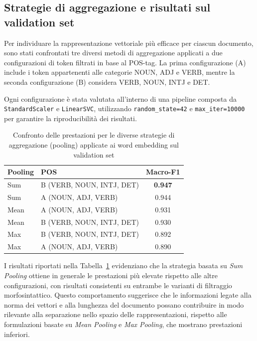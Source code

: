 \documentclass{article}
\begin{document}
\subsection{Strategie di aggregazione e risultati sul validation set}

Per individuare la rappresentazione vettoriale più efficace per ciascun documento, sono stati confrontati tre diversi metodi di aggregazione applicati a due configurazioni di token filtrati in base al POS-tag. La prima configurazione (A) include i token appartenenti alle categorie NOUN, ADJ e VERB, mentre la seconda configurazione (B) considera VERB, NOUN, INTJ e DET.

Ogni configurazione è stata valutata all’interno di una pipeline composta da \texttt{StandardScaler} e \texttt{LinearSVC}, utilizzando \texttt{random\_state=42} e \texttt{max\_iter=10000} per garantire la riproducibilità dei risultati.

\begin{table}[h]
\centering
\begin{tabular}{llc}
\toprule
\textbf{Pooling} & \textbf{POS} & \textbf{Macro-F1} \\
\midrule
Sum & B (VERB, NOUN, INTJ, DET) & \textbf{0.947} \\
Sum & A (NOUN, ADJ, VERB) & 0.944 \\
Mean & A (NOUN, ADJ, VERB) & 0.931 \\
Mean & B (VERB, NOUN, INTJ, DET) & 0.930 \\
Max & B (VERB, NOUN, INTJ, DET) & 0.892 \\
Max & A (NOUN, ADJ, VERB) & 0.890 \\
\bottomrule
\end{tabular}
\caption{Confronto delle prestazioni per le diverse strategie di aggregazione (pooling) applicate ai word embedding sul validation set}
\label{tab:pooling_results}
\end{table}

I risultati riportati nella Tabella~\ref{tab:pooling_results} evidenziano che la strategia basata su \textit{Sum Pooling} ottiene in generale le prestazioni più elevate rispetto alle altre configurazioni, con risultati consistenti su entrambe le varianti di filtraggio morfosintattico. Questo comportamento suggerisce che le informazioni legate alla norma dei vettori e alla lunghezza del documento possano contribuire in modo rilevante alla separazione nello spazio delle rappresentazioni, rispetto alle formulazioni basate su \textit{Mean Pooling} e \textit{Max Pooling}, che mostrano prestazioni inferiori.
\end{document}
